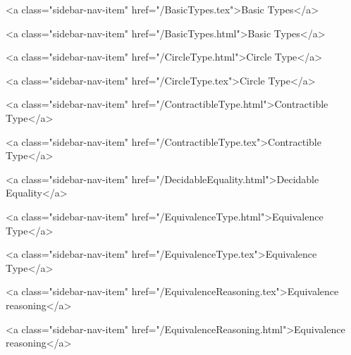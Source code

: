       
    
      
        
          <a class="sidebar-nav-item" href="/BasicTypes.tex">Basic Types</a>
        
      
    
      
        
          <a class="sidebar-nav-item" href="/BasicTypes.html">Basic Types</a>
        
      
    
      
        
          <a class="sidebar-nav-item" href="/CircleType.html">Circle Type</a>
        
      
    
      
        
          <a class="sidebar-nav-item" href="/CircleType.tex">Circle Type</a>
        
      
    
      
        
          <a class="sidebar-nav-item" href="/ContractibleType.html">Contractible Type</a>
        
      
    
      
        
          <a class="sidebar-nav-item" href="/ContractibleType.tex">Contractible Type</a>
        
      
    
      
        
          <a class="sidebar-nav-item" href="/DecidableEquality.html">Decidable Equality</a>
        
      
    
      
        
          <a class="sidebar-nav-item" href="/EquivalenceType.html">Equivalence Type</a>
        
      
    
      
        
          <a class="sidebar-nav-item" href="/EquivalenceType.tex">Equivalence Type</a>
        
      
    
      
        
          <a class="sidebar-nav-item" href="/EquivalenceReasoning.tex">Equivalence reasoning</a>
        
      
    
      
        
          <a class="sidebar-nav-item" href="/EquivalenceReasoning.html">Equivalence reasoning</a>
        
